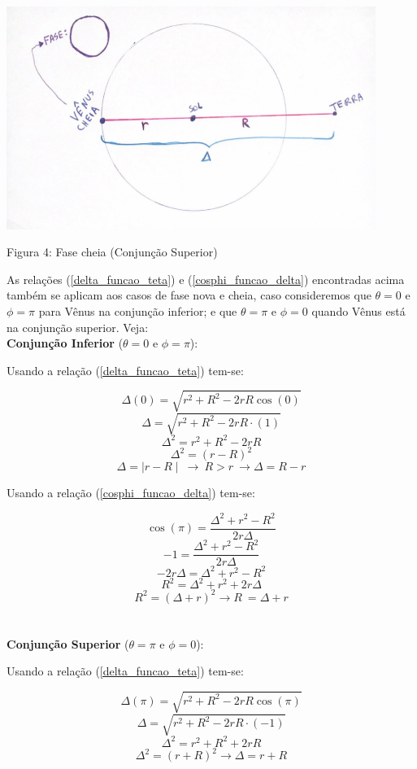 \documentclass[a4paper, 12pt]{article}
\begin{document}
\begin{center}
    \includegraphics[width=12cm]{04-cheia.PNG}
    
    Figura 4: Fase cheia (Conjunção Superior)
\end{center}

As relações (\ref{delta_funcao_teta}) e (\ref{cosphi_funcao_delta}) encontradas acima também se aplicam aos casos de fase nova e cheia, caso consideremos que $\theta=0$ e $\phi=\pi$ para Vênus na conjunção inferior; e que $\theta=\pi$ e $\phi=0$ quando Vênus está na conjunção superior. Veja:\\

\textbf{Conjunção Inferior} ($\theta=0$ e $\phi=\pi$):

Usando a relação (\ref{delta_funcao_teta}) tem-se:

$$\Delta \left(0 \right)=\sqrt{r^2+R^2-2rR\cos \left(0 \right)}$$
$$\Delta =\sqrt{r^2+R^2-2rR\cdot(1)}$$
$$\Delta ^2=r^2+R^2-2rR$$
$$\Delta ^2=\left(r-R\right)^2$$
$$\Delta =\mid r-R\mid \ \longrightarrow \ R>r\ \longrightarrow \boxed{\Delta =R-r}$$

Usando a relação (\ref{cosphi_funcao_delta}) tem-se:

$$\cos \left(\pi \right)=\frac{\Delta ^2+r^2-R^2}{2r\Delta }$$
$$-1=\frac{\Delta ^2+r^2-R^2}{2r\Delta }$$
$$-2r\Delta =\Delta ^2+r^2-R^2$$
$$R^2=\Delta ^2+r^2+2r\Delta $$
$$R^2=\left(\Delta +r\right)^2\longrightarrow \boxed{R\ =\Delta +r}$$\\ \\


\textbf{Conjunção Superior} ($\theta=\pi$ e $\phi=0$):

Usando a relação (\ref{delta_funcao_teta}) tem-se:

$$\Delta \left(\pi \right)=\sqrt{r^2+R^2-2rR\cos \left(\pi \right)}$$
$$\Delta =\sqrt{r^2+R^2-2rR\cdot(-1)}$$
$$\Delta ^2=r^2+R^2+2rR$$
$$\Delta ^2=\left(r+R\right)^2\longrightarrow \boxed{\Delta =r+R}$$
\end{document}
